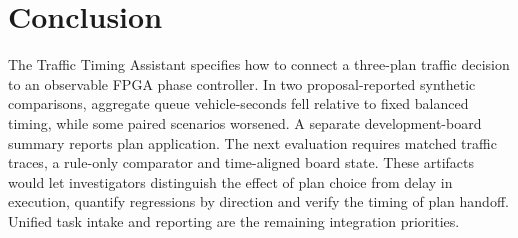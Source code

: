 \section{Conclusion}
The Traffic Timing Assistant specifies how to connect a three-plan traffic decision to an observable FPGA phase controller. In two proposal-reported synthetic comparisons, aggregate queue vehicle-seconds fell relative to fixed balanced timing, while some paired scenarios worsened. A separate development-board summary reports plan application. The next evaluation requires matched traffic traces, a rule-only comparator and time-aligned board state. These artifacts would let investigators distinguish the effect of plan choice from delay in execution, quantify regressions by direction and verify the timing of plan handoff. Unified task intake and reporting are the remaining integration priorities.
